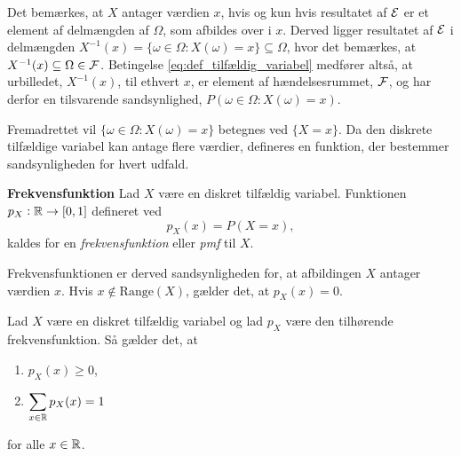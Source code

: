 Det bemærkes, at $X$ antager værdien $x$, hvis og kun hvis resultatet af $\mathcal{E}$ er et element af delmængden af $\Omega$, som afbildes over i $x$. Derved ligger resultatet af $\mathcal{E}$ i delmængden $X^{-1}(x) = \{\omega\in \Omega: X(\omega)=x\} \subseteq \Omega$, hvor det bemærkes, at  $X^{-1}(x)\subseteq \Omega \in \mathcal{F}$.
Betingelse \eqref{eq:def_tilfældig_variabel} medfører altså, at urbilledet, $X^{-1}(x)$, til ethvert $x$, er element af hændelsesrummet, $\mathcal{F}$, og har derfor en tilsvarende sandsynlighed, $P(\omega\in \Omega: X(\omega)=x)$.

Fremadrettet vil $\{\omega\in \Omega: X(\omega)=x\}$ betegnes ved $\{X=x\}$. Da den diskrete tilfældige variabel kan antage flere værdier, defineres en funktion, der bestemmer sandsynligheden for hvert udfald.

\begin{minipage}\textwidth
\begin{defn}\label{def:Frekvensfunktionen}\textbf{Frekvensfunktion} %
\newline
    Lad $X$ være en diskret tilfældig variabel. %
    Funktionen $p_X:\mathbb{R}\to [0,1]$ defineret ved
%    
    $$ p_X(x) = P(X = x),$$
%    
    kaldes for en \textit{frekvensfunktion} eller \textit{pmf} til $X$.
\end{defn}
\end{minipage}

Frekvensfunktionen er derved sandsynligheden for, at afbildingen $X$ antager værdien $x$.
Hvis $x\not\in \text{Range}(X)$, gælder det, at $p_X(x) = 0$. 


\begin{pro}\label{prop:frekvensfunktion}\textbf{}
\newline
    Lad $X$ være en diskret tilfældig variabel og lad $p_X$ være den tilhørende frekvensfunktion. Så gælder det, at
    \begin{enumerate}
        \item $\displaystyle p_X(x)\geq 0$,
        \item $\displaystyle \sum_{x\in \mathbb{R}} p_X(x)=1$
    \end{enumerate}
    for alle $x\in \mathbb{R}$.
\end{pro}


